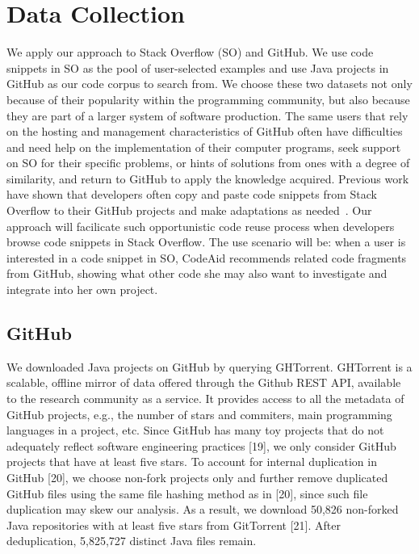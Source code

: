 \section{Data Collection}
\label{sec:dataset}
We apply our approach to Stack Overflow (SO) and GitHub. We use code snippets in SO as the pool of user-selected examples and use Java projects in GitHub as our code corpus to search from. We choose these two datasets not only because of their popularity within the programming community, but also because they are part of a larger system of software production. The same users that rely on the hosting and management characteristics of GitHub often have difficulties and need help on the implementation of their computer programs, seek support on SO for their specific problems, or hints of solutions from ones with a degree of similarity, and return to GitHub to apply the knowledge acquired. Previous work have shown that developers often copy and paste code snippets from Stack Overflow to their GitHub projects and make adaptations as needed~\cite{yang2017stack, an2017stack, wu2018developers, zhang2019analyzing}. Our approach will facilicate such opportunistic code reuse process when developers browse code snippets in Stack Overflow. The use scenario will be: when a user is interested in a code snippet in SO, CodeAid recommends related code fragments from GitHub, showing what other code she may also want to investigate and integrate into her own project.  


\subsection{GitHub}
We downloaded Java projects on GitHub by querying GHTorrent. GHTorrent is a scalable, offline mirror of data offered through the Github REST API, available to the research community as a service. It provides access to all the metadata of GitHub projects, e.g., the number of stars and commiters, main programming languages in a project, etc. Since GitHub has many toy projects that do not adequately reflect software engineering practices [19], we only consider GitHub projects that have at least five stars. To account for internal duplication in GitHub [20], we choose non-fork projects only and further remove duplicated GitHub files using the same file hashing method as in [20], since such file duplication may skew our analysis. As a result, we download 50,826 non-forked Java repositories with at least five stars from GitTorrent [21]. After deduplication, 5,825,727 distinct Java files remain.


